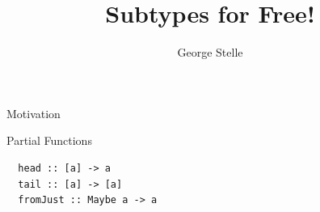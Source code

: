 \documentclass[final]{beamer}
\title{Subtypes for Free!}
\author{George Stelle}
\institute{University of New Mexico}
\begin{document}
\begin{frame}[fragile]
\titlepage
\end{frame}
\begin{frame}{Motivation}
\centering
{}
\vspace{2cm}

\end{frame}

\begin{frame}[fragile]{Partial Functions}
\centering
\begin{verbatim}
  head :: [a] -> a
  tail :: [a] -> [a]
  fromJust :: Maybe a -> a
\end{verbatim}
\end{frame}
\end{document}
